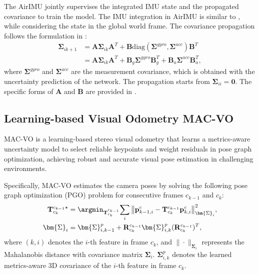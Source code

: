 The AirIMU jointly supervises the integrated IMU state and the propagated covariance to train the model. The IMU integration in AirIMU is similar to , while considering the state in the global world frame. The covariance propagation follows the formulation in \cite{forster_imu}:
\begin{equation}
\label{eq:maci2:cov_prop}
\begin{aligned}
\bm{\Sigma}_{ik+1} &= \mathbf{A}\bm{\Sigma}_{ik}\mathbf{A}^T + \mathbf{B}\text{diag}(\bm{\Sigma}^{gyro}, \bm{\Sigma}^{acc})\mathbf{B}^T \\
&= \mathbf{A}\bm{\Sigma}_{ik}\mathbf{A}^T + \mathbf{B}_g\bm{\Sigma}^{gyro}\mathbf{B}_g^T + \mathbf{B}_a\bm{\Sigma}^{acc}\mathbf{B}_a^T,
\end{aligned}
\end{equation}
where $\bm{\Sigma}^{gyro}$ and $\bm{\Sigma}^{acc}$ are the measurement covariance, which is obtained with the uncertainty prediction of the network. The propagation starts from $\bm{\Sigma}_{ii} = \mathbf{0}$. The specific forms of $\mathbf{A}$ and $\mathbf{B}$ are provided in .

\subsection{Learning-based Visual Odometry MAC-VO}
MAC-VO \cite{qiu2025mac} is a learning-based stereo visual odometry that learns a metrics-aware uncertainty model to select reliable keypoints and weight residuals in pose graph optimization, achieving robust and accurate visual pose estimation in challenging environments.

Specifically, MAC-VO estimates the camera poses by solving the following pose graph optimization (PGO) problem for consecutive frames $c_{k-1}$ and $c_k$:
\begin{equation}
\begin{aligned}
    \mathbf{T}^{c_{k-1}}_{c_k}{}^\star &= \argmin_{\mathbf{T}^{c_{k-1}}_{c_k}}{\sum_{i}{\left\| \mathbf{p}_{k-1, i}^{c} - \mathbf{T}^{c_{k-1}}_{c_k} \mathbf{p}^{c}_{k, i} \right\|^2_{\bm{\Sigma}_i}}}, \\
    \bm{\Sigma}_i &= \bm{\Sigma}^p_{i,k-1} + \mathbf{R}^{c_{k-1}}_{c_k} \bm{\Sigma}^p_{i,k} (\mathbf{R}^{c_{k-1}}_{c_k})^T,
\end{aligned}
\label{eq:maci2:macvo}
\end{equation}
where $(k, i)$ denotes the $i$-th feature in frame $c_k$, and $\|\cdot\|_{\bm{\Sigma}_i}$ represents the Mahalanobis distance with covariance matrix $\bm{\Sigma}_i$. $\bm{\Sigma}^p_{i,k}$ denotes the learned metrics-aware 3D covariance of the $i$-th feature in frame $c_k$.


